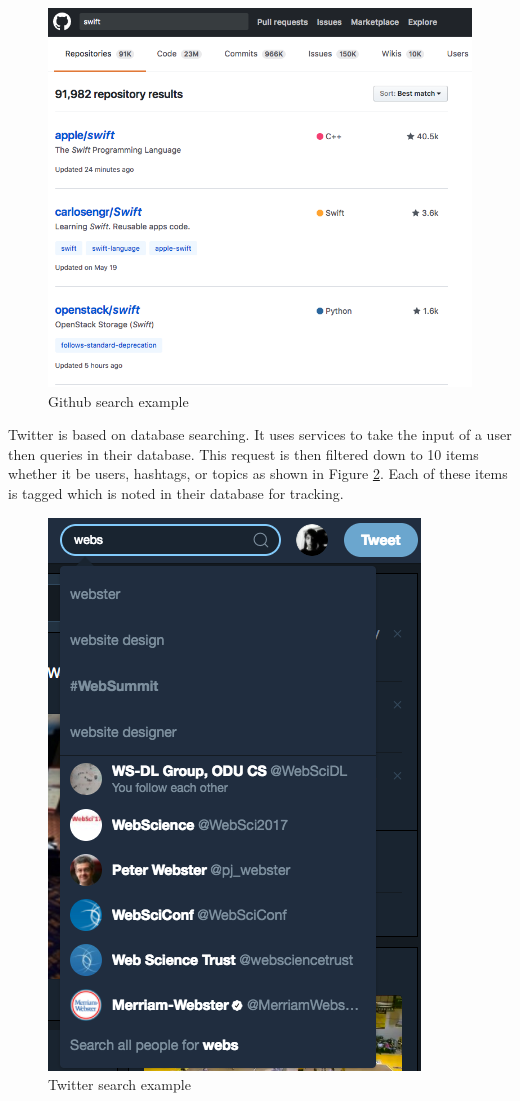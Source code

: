 \documentclass[letterpaper,11pt]{article}
\begin{document}
\begin{figure}[h]
\centering
\includegraphics[scale=0.35]{github.png}
\caption{Github search example}
\label{fig:github}
\end{figure}

Twitter is based on database searching. It uses services to take the input of a user then queries in their database.
This request is then filtered down to 10 items whether it be users, hashtags, or topics as shown in Figure \ref{fig:twitter}.
Each of these items is tagged which is noted in their database for tracking.

\begin{figure}[h]
\centering
\includegraphics[scale=0.35]{twitter.png}
\caption{Twitter search example}
\label{fig:twitter}
\end{figure}
\end{document}
